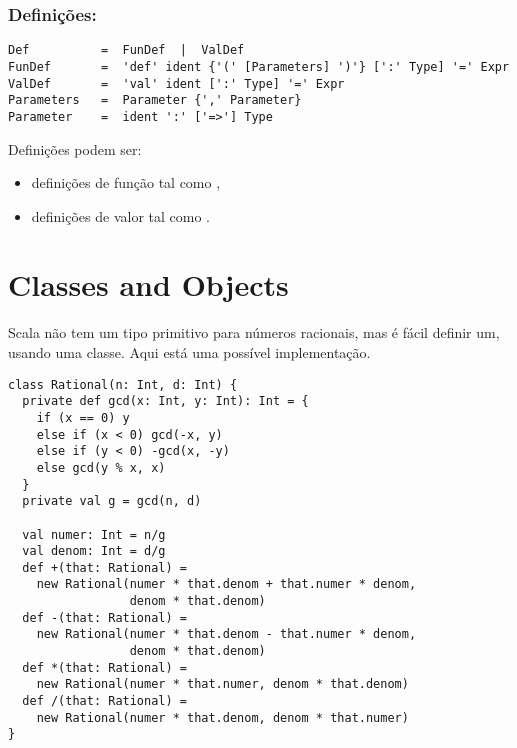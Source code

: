 \subsection*{Defini\c{c}\~{o}es:}
\begin{lstlisting}
Def          =  FunDef  |  ValDef
FunDef       =  'def' ident {'(' [Parameters] ')'} [':' Type] '=' Expr
ValDef       =  'val' ident [':' Type] '=' Expr
Parameters   =  Parameter {',' Parameter}
Parameter    =  ident ':' ['=>'] Type
\end{lstlisting}
Defini\c{c}\~{o}es podem ser:
\begin{itemize}
\item
defini\c{c}\~{o}es de fun\c{c}\~{a}o tal como ,
\item
defini\c{c}\~{o}es de valor tal como .
\end{itemize}

\chapter{Classes and Objects}
\label{chap:classes}

Scala n\~{a}o tem um tipo primitivo para n\'{u}meros racionais, mas \'{e} f\'{a}cil 
definir um, usando uma classe. Aqui est\'{a} uma poss\'{i}vel implementa\c{c}\~{a}o.

\begin{lstlisting}
class Rational(n: Int, d: Int) {
  private def gcd(x: Int, y: Int): Int = {
    if (x == 0) y
    else if (x < 0) gcd(-x, y)
    else if (y < 0) -gcd(x, -y)
    else gcd(y % x, x)
  }
  private val g = gcd(n, d)

  val numer: Int = n/g
  val denom: Int = d/g
  def +(that: Rational) =
    new Rational(numer * that.denom + that.numer * denom,
                 denom * that.denom)
  def -(that: Rational) =
    new Rational(numer * that.denom - that.numer * denom, 
                 denom * that.denom)
  def *(that: Rational) =
    new Rational(numer * that.numer, denom * that.denom)
  def /(that: Rational) =
    new Rational(numer * that.denom, denom * that.numer)
}
\end{lstlisting}

